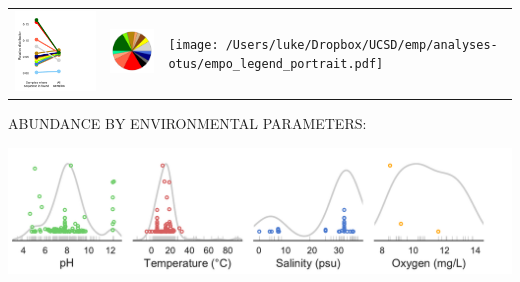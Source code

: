 \documentclass[10pt]{amsart}
\begin{document}
\begin{raggedright}
\begin{tabular}{@{} L{5.5cm} @{ } L{5.4cm} @{} L{4cm}}
\includegraphics[width=9cm]{point.pdf} & 
\includegraphics[width=5cm]{pie.pdf} &
\texttt{[image: /Users/luke/Dropbox/UCSD/emp/analyses-otus/empo\_legend\_portrait.pdf]}
\end{tabular}

ABUNDANCE BY ENVIRONMENTAL PARAMETERS:

\vspace{-3mm}

\includegraphics[width=\textwidth]{envparams.pdf}

\end{raggedright}



\end{document}
